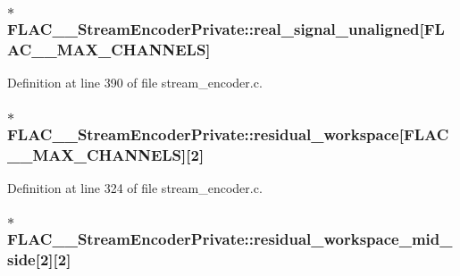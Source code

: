 \subsubsection[{\texorpdfstring{real\+\_\+signal\+\_\+unaligned}{real_signal_unaligned}}]{$\ast$ F\+L\+A\+C\+\_\+\+\_\+\+Stream\+Encoder\+Private\+::real\+\_\+signal\+\_\+unaligned\mbox{[}{\bf F\+L\+A\+C\+\_\+\+\_\+\+M\+A\+X\+\_\+\+C\+H\+A\+N\+N\+E\+LS}\mbox{]}}\hypertarget{struct_f_l_a_c_____stream_encoder_private_a749bd8576ec48d4a732aed02d94423fd}{}\label{struct_f_l_a_c_____stream_encoder_private_a749bd8576ec48d4a732aed02d94423fd}


Definition at line 390 of file stream\+\_\+encoder.\+c.

\subsubsection[{\texorpdfstring{residual\+\_\+workspace}{residual_workspace}}]{$\ast$ F\+L\+A\+C\+\_\+\+\_\+\+Stream\+Encoder\+Private\+::residual\+\_\+workspace\mbox{[}{\bf F\+L\+A\+C\+\_\+\+\_\+\+M\+A\+X\+\_\+\+C\+H\+A\+N\+N\+E\+LS}\mbox{]}\mbox{[}2\mbox{]}}\hypertarget{struct_f_l_a_c_____stream_encoder_private_adf93a00e0079e396ce2fd535826300ab}{}\label{struct_f_l_a_c_____stream_encoder_private_adf93a00e0079e396ce2fd535826300ab}


Definition at line 324 of file stream\+\_\+encoder.\+c.

\subsubsection[{\texorpdfstring{residual\+\_\+workspace\+\_\+mid\+\_\+side}{residual_workspace_mid_side}}]{$\ast$ F\+L\+A\+C\+\_\+\+\_\+\+Stream\+Encoder\+Private\+::residual\+\_\+workspace\+\_\+mid\+\_\+side\mbox{[}2\mbox{]}\mbox{[}2\mbox{]}}\hypertarget{struct_f_l_a_c_____stream_encoder_private_a02f0fa04f3ac304d61f85fe58fe918ca}{}\label{struct_f_l_a_c_____stream_encoder_private_a02f0fa04f3ac304d61f85fe58fe918ca}


